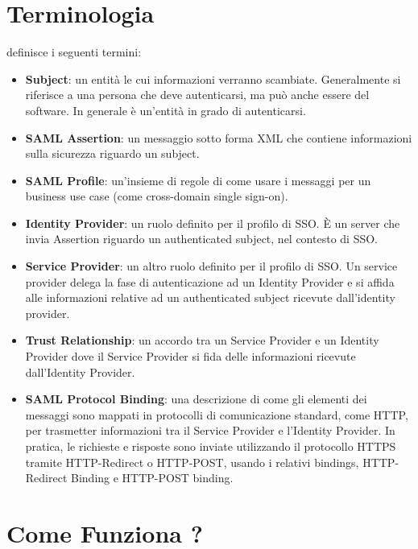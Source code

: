 \section{Terminologia}

\saml{} definisce i seguenti termini:

\begin{itemize}
      \item \textbf{Subject}: un entità le cui informazioni verranno scambiate.
            Generalmente si riferisce a una persona che deve autenticarsi,
            ma può anche essere
            del software. In generale è un'entità in grado di autenticarsi.
      \item \textbf{SAML Assertion}: un messaggio sotto forma XML che contiene
            informazioni sulla sicurezza riguardo un subject.
      \item \textbf{SAML Profile}: un'insieme di regole di come usare i messaggi \saml{}
            per un business use case (come cross-domain single sign-on).
      \item \textbf{Identity Provider}: un ruolo definito per il profilo \saml{} di SSO.
            È un server che invia \saml{} Assertion riguardo un authenticated subject, nel
            contesto di SSO.
      \item \textbf{Service Provider}: un altro ruolo definito per il profilo \saml{} di
            SSO. Un service provider delega la fase di autenticazione ad un Identity
            Provider e si affida alle informazioni relative ad un authenticated
            subject ricevute dall'identity provider.
      \item \textbf{Trust Relationship}: un accordo tra un \saml{} Service Provider e un
            \saml{} Identity Provider dove il Service Provider si fida delle informazioni
            ricevute dall'Identity Provider.
      \item \textbf{SAML Protocol Binding}: una descrizione di come gli elementi
            dei messaggi \saml{} sono mappati in protocolli di comunicazione standard,
            come HTTP, per trasmetter informazioni tra il Service Provider e l'Identity
            Provider. In pratica, le richieste e risposte \saml{} sono inviate utilizzando
            il protocollo HTTPS tramite HTTP-Redirect o HTTP-POST, usando i relativi
            bindings, HTTP-Redirect Binding e HTTP-POST binding.
\end{itemize}

\section{Come Funziona ?}

